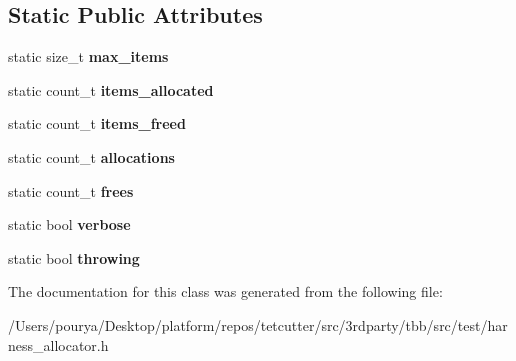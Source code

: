 \subsection*{Static Public Attributes}
\begin{DoxyCompactItemize}
\item 
\hypertarget{classstatic__shared__counting__allocator__base_aa5eaff66e6d3fac1a7286e03cd34a05a}{}static size\+\_\+t {\bfseries max\+\_\+items}\label{classstatic__shared__counting__allocator__base_aa5eaff66e6d3fac1a7286e03cd34a05a}

\item 
\hypertarget{classstatic__shared__counting__allocator__base_afea6c7bc17ec090afe792cf4e881ff03}{}static count\+\_\+t {\bfseries items\+\_\+allocated}\label{classstatic__shared__counting__allocator__base_afea6c7bc17ec090afe792cf4e881ff03}

\item 
\hypertarget{classstatic__shared__counting__allocator__base_a94c55c56926b6e71bd44e2423ebbaa30}{}static count\+\_\+t {\bfseries items\+\_\+freed}\label{classstatic__shared__counting__allocator__base_a94c55c56926b6e71bd44e2423ebbaa30}

\item 
\hypertarget{classstatic__shared__counting__allocator__base_aaeb9c3c62d0e87d85540a3ffc7e6f424}{}static count\+\_\+t {\bfseries allocations}\label{classstatic__shared__counting__allocator__base_aaeb9c3c62d0e87d85540a3ffc7e6f424}

\item 
\hypertarget{classstatic__shared__counting__allocator__base_a826adad218482f1a18a90cc486eb5368}{}static count\+\_\+t {\bfseries frees}\label{classstatic__shared__counting__allocator__base_a826adad218482f1a18a90cc486eb5368}

\item 
\hypertarget{classstatic__shared__counting__allocator__base_a8cda0817b8a3557a4869d632eb0cc17e}{}static bool {\bfseries verbose}\label{classstatic__shared__counting__allocator__base_a8cda0817b8a3557a4869d632eb0cc17e}

\item 
\hypertarget{classstatic__shared__counting__allocator__base_a65877e095201d6c8a25a3a59ee5e168c}{}static bool {\bfseries throwing}\label{classstatic__shared__counting__allocator__base_a65877e095201d6c8a25a3a59ee5e168c}

\end{DoxyCompactItemize}


The documentation for this class was generated from the following file\+:\begin{DoxyCompactItemize}
\item 
/\+Users/pourya/\+Desktop/platform/repos/tetcutter/src/3rdparty/tbb/src/test/harness\+\_\+allocator.\+h\end{DoxyCompactItemize}
